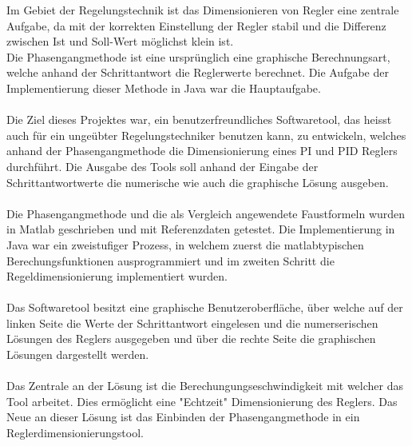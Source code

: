 Im Gebiet der Regelungstechnik ist das Dimensionieren von Regler eine zentrale Aufgabe, da mit der korrekten Einstellung der Regler stabil und die Differenz zwischen Ist und Soll-Wert möglichst klein ist.\\
Die Phasengangmethode ist eine ursprünglich eine graphische Berechnungsart, welche anhand der Schrittantwort die Reglerwerte berechnet. Die Aufgabe der Implementierung dieser Methode in Java war die Hauptaufgabe.\\
\\
Die Ziel dieses Projektes war, ein  benutzerfreundliches Softwaretool, das heisst auch für ein ungeübter Regelungstechniker benutzen kann,  zu entwickeln, welches anhand der Phasengangmethode die Dimensionierung eines PI und PID Reglers durchführt. Die Ausgabe des   Tools soll anhand der Eingabe der Schrittantwortwerte die numerische wie auch die graphische Lösung ausgeben.\\
\\
Die Phasengangmethode und die als Vergleich angewendete Faustformeln wurden in Matlab geschrieben und mit Referenzdaten getestet. Die Implementierung in Java war ein zweistufiger Prozess, in welchem zuerst die matlabtypischen Berechungsfunktionen ausprogrammiert  und im zweiten Schritt die Regeldimensionierung implementiert wurden.\\
\\
Das Softwaretool besitzt eine graphische Benutzeroberfläche, über welche auf der linken Seite die Werte der Schrittantwort eingelesen und die numerserischen Lösungen des Reglers ausgegeben  und über die rechte Seite die graphischen Lösungen dargestellt werden.\\
\\
Das Zentrale an der Lösung ist die Berechungungseschwindigkeit mit welcher das Tool arbeitet. Dies ermöglicht eine "Echtzeit" Dimensionierung des Reglers. Das Neue an dieser Lösung ist das Einbinden der Phasengangmethode in ein Reglerdimensionierungstool.